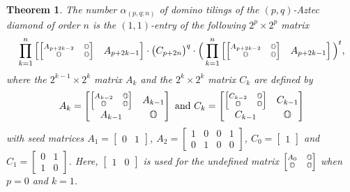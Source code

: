 \documentclass[11pt,a4paper]{amsart}
\newtheorem{theorem}{Theorem}
\begin{document}
\begin{theorem}\label{thm:main}
The number $\alpha_{(p,q;n)}$ of domino tilings of the $(p,q)$-Aztec diamond of order $n$
is the $(1,1)$-entry of the following $2^p \! \times \! 2^p$ matrix
$$\prod_{k=1}^n \begin{bmatrix}
\scriptsize{\begin{bmatrix} A_{p+2k-2} & \mathbb{O} \\ \mathbb{O} & \mathbb{O} \end{bmatrix}}
& A_{p+2k-1} \end{bmatrix}
\cdot \big(C_{p+2n}\big)^q \cdot
\Big(\prod_{k=1}^n \begin{bmatrix}
\scriptsize{\begin{bmatrix} A_{p+2k-2} & \mathbb{O} \\ \mathbb{O} & \mathbb{O} \end{bmatrix}}
& A_{p+2k-1} \end{bmatrix}\Big)^t,$$
where the $2^{k-1} \times 2^k$ matrix $A_k$ and  the $2^k \times 2^k$ matrix $C_k$ are
defined by 
$$A_k = \begin{bmatrix}
\scriptsize{\begin{bmatrix} A_{k-2} & \mathbb{O} \\ \mathbb{O} & \mathbb{O} \end{bmatrix}}
& A_{k-1} \\ A_{k-1} & \mathbb{O} \end{bmatrix} \mbox{ and }
C_k = \begin{bmatrix}
\scriptsize{\begin{bmatrix} C_{k-2} & \mathbb{O} \\ \mathbb{O} & \mathbb{O} \end{bmatrix}}
& C_{k-1} \\ C_{k-1} & \mathbb{O} \end{bmatrix}$$
with seed matrices
$A_1 \! = \! \begin{bmatrix} 0 & 1 \end{bmatrix}$,
$A_2 \! = \! \begin{bmatrix} 1 & 0 & 0 & 1 \\ 0 & 1 & 0 & 0 \end{bmatrix}$,
$C_0 \! = \! \begin{bmatrix} 1 \end{bmatrix}$ and
$C_1 \! = \! \begin{bmatrix} 0 & 1 \\ 1 & 0 \end{bmatrix}$.
Here, $\begin{bmatrix} 1 & 0 \end{bmatrix}$ is used for the undefined matrix
$\scriptsize{\begin{bmatrix} A_0 & \mathbb{O} \\ \mathbb{O} & \mathbb{O} \end{bmatrix}}$
when $p \! = \! 0$ and $k \! = \! 1$.
\end{theorem}
 
\end{document}
